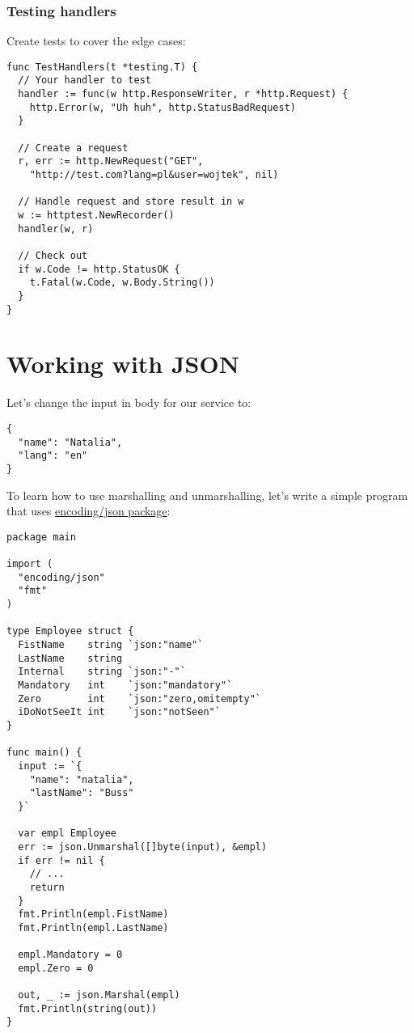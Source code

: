 \documentclass[11pt, letterpaper]{article}
\begin{document}
\subsubsection{Testing handlers}

Create tests to cover the edge cases:

\begin{verbatim}
func TestHandlers(t *testing.T) {
  // Your handler to test
  handler := func(w http.ResponseWriter, r *http.Request) {
    http.Error(w, "Uh huh", http.StatusBadRequest)
  }

  // Create a request
  r, err := http.NewRequest("GET",
    "http://test.com?lang=pl&user=wojtek", nil)

  // Handle request and store result in w
  w := httptest.NewRecorder()
  handler(w, r)

  // Check out
  if w.Code != http.StatusOK {
    t.Fatal(w.Code, w.Body.String())
  }
}
\end{verbatim}

\section{Working with JSON}

Let's change the input in body for our service to:

\begin{verbatim}
{
  "name": "Natalia",
  "lang": "en"
}
\end{verbatim}

To learn how to use marshalling and unmarshalling, let's write a simple program that uses \href{https://golang.org/pkg/encoding/json/}{encoding/json package}:

\begin{verbatim}
package main

import (
  "encoding/json"
  "fmt"
)

type Employee struct {
  FistName    string `json:"name"`
  LastName    string
  Internal    string `json:"-"`
  Mandatory   int    `json:"mandatory"`
  Zero        int    `json:"zero,omitempty"`
  iDoNotSeeIt int    `json:"notSeen"`
}

func main() {
  input := `{
    "name": "natalia",
    "lastName": "Buss"
  }`

  var empl Employee
  err := json.Unmarshal([]byte(input), &empl)
  if err != nil {
    // ...
    return
  }
  fmt.Println(empl.FistName)
  fmt.Println(empl.LastName)

  empl.Mandatory = 0
  empl.Zero = 0

  out, _ := json.Marshal(empl)
  fmt.Println(string(out))
}
\end{verbatim}
\end{document}
